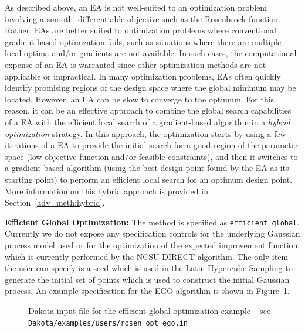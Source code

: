 As described above, an EA is not well-suited to an optimization
problem involving a smooth, differentiable objective such as the
Rosenbrock function. Rather, EAs are better suited to optimization
problems where conventional gradient-based optimization fails, such as
situations where there are multiple local optima and/or gradients are
not available. In such cases, the computational expense of an EA is
warranted since other optimization methods are not applicable or
impractical. In many optimization problems, EAs often quickly identify
promising regions of the design space where the global minimum may be
located. However, an EA can be slow to converge to the optimum. For
this reason, it can be an effective approach to combine the global
search capabilities of a EA with the efficient local search of a
gradient-based algorithm in a \emph{hybrid optimization} strategy. In
this approach, the optimization starts by using a few iterations of a
EA to provide the initial search for a good region of the parameter
space (low objective function and/or feasible constraints), and then
it switches to a gradient-based algorithm (using the best design point
found by the EA as its starting point) to perform an efficient local
search for an optimum design point. More information on this hybrid
approach is provided in Section~\ref{adv_meth:hybrid}.

{\bf Efficient Global Optimization:} The method is specified as
\texttt{efficient\_global}.  Currently we do not expose any
specification controls for the underlying Gaussian process model used
or for the optimization of the expected improvement function, which is
currently performed by the NCSU DIRECT algorithm. The only item the
user can specify is a seed which is used in the Latin Hypercube
Sampling to generate the initial set of points which is used to
construct the initial Gaussian process.  An example specification for
the EGO algorithm is shown in Figure~\ref{opt:methods:gradientfree:global:example:egm_rosen}.
\begin{figure}
  \begin{bigbox}
    \begin{small}
    \end{small}
  \end{bigbox}
  \caption{Dakota input file for the efficient global optimization example --
see \texttt{Dakota/examples/users/rosen\_opt\_ego.in} }
  \label{opt:methods:gradientfree:global:example:egm_rosen}
\end{figure}


